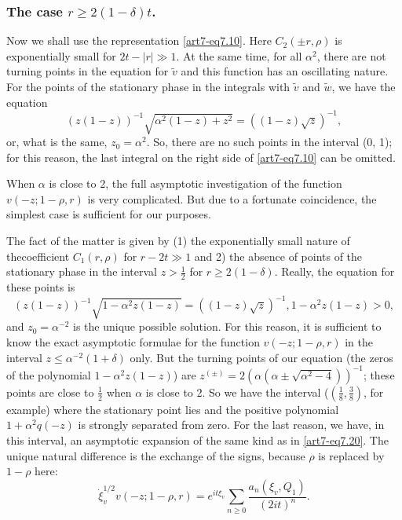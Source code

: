 \setcounter{section}{2}
\subsubsection{The case {\boldmath$r \geqslant 2 (1-\delta)t$}.}\label{art7-subsubsec2.6.7}
Now we shall use the representation \eqref{art7-eq7.10}. Here $C_2 (\pm r, \rho)$ is exponentially small for $2t - |r| \gg 1$. At the same time, for all $\alpha^2$, there are not turning points in the equation for $\tilde{v}$ and this function has an oscillating nature. For the points of the stationary phase in the integrals with $\tilde{v}$ and $\tilde{w}$, we have the equation 
\setcounter{section}{7}
\begin{equation}
(z(1-z))^{-1} \sqrt{\alpha^2 (1-z) + z^2} = ((1-z) \sqrt{z})^{-1}, \label{art7-eq7.42}
\end{equation}
or, what is the same, $z_0 = \alpha^2$. So, there are no such points in the interval (0, 1); for this reason, the last integral on the right side of \eqref{art7-eq7.10} can be omitted.

When $\alpha$ is close to 2, the full asymptotic investigation of the function $v(-z; 1 - \rho , r)$ is very complicated. But due to a fortunate coincidence, the simplest case is sufficient for our purposes.

The fact of the matter is given by (1) the exponentially small nature of the\pageoriginale coefficient $C_1 (r, \rho)$ for $r- 2 t \gg 1$ and 2) the absence of points of the stationary phase in the interval $z > \frac{1}{2}$ for $ r \geqslant 2(1 -\delta)$. Really, the equation for these points is
\begin{equation}
(z (1-z))^{-1} \sqrt{1 - \alpha^2 z (1 -z)} = ((1 -z)\sqrt{z})^{-1}, 1 -\alpha^2 z(1-z) > 0, \label{art7-eq7.43}
\end{equation}
and $z_0 = \alpha^{-2}$ is the unique possible solution. For this reason, it is sufficient to know the exact asymptotic formulae for the function $v(-z; 1- \rho, r)$  in the interval $z \leqslant \alpha^{-2} (1+\delta)$ only. But the turning points of our equation (the zeros of the polynomial $1-\alpha^2 z (1-z)$) are $z^{(\pm)} = 2 (\alpha (\alpha \pm \sqrt{\alpha^2 -4}))^{-1}$; these points are close to $\frac{1}{2}$ when $\alpha$ is close to 2. So we have the interval ($(\frac{1}{8}, \frac{3}{8})$, for example) where the stationary point lies and the positive polynomial $1+ \alpha^2  q(-z)$ is strongly separated from zero. For the last reason, we have, in this interval, an asymptotic expansion of the same kind as in \eqref{art7-eq7.20}. The unique natural difference is the exchange of the signs, because $\rho$ is replaced by $1-\rho$ here:
\setcounter{equation}{42}
\begin{equation}
\dot{\xi}^{1/2}_v v(-z; 1 - \rho, r) = e^{it \xi_v} \sum\limits_{n \geqslant 0} \frac{a_n (\xi_v, Q_1)}{(2 it)^n}.  \label{art7-add-eq7.43}
\end{equation}

